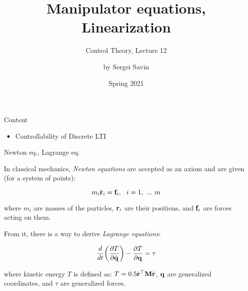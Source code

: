 \documentclass{beamer}
\title{Manipulator equations, Linearization}
\subtitle{Control Theory, Lecture 12}
\author{by Sergei Savin}
\date{Spring 2021}
\begin{document}
\maketitle


\begin{frame}{Content}
\begin{itemize}
\item Controllability of Discrete LTI
\end{itemize}
\end{frame}


\begin{frame}{Newton eq., Lagrange eq.}
\begin{flushleft}

In classical mechanics, \emph{Newton equations} are accepted as an axiom and are given (for a system of points):

\begin{equation}
\label{eq:Newton}
    m_i\ddot{\mathbf{r}}_i = \mathbf{f}_i, \ \ i = 1, \ ... \ m  
\end{equation}

where $m_i$ are masses of the particles, $\mathbf{r}_i$ are their positions, and $\mathbf{f}_i$ are forces acting on them.

\bigskip

From it, there is a way to derive \emph{Lagrange equations}:

\begin{equation}
\label{eq:Lagrange}
    \frac{d}{dt} \bigg( 
    \frac{\partial T }{\partial \dot{\mathbf{q}}}
    \bigg) - 
    \frac{\partial T }{\partial \mathbf{q}} = \tau
\end{equation}

where kinetic energy $T$ is defined as: $T = 0.5 \dot{\mathbf{r}} ^\top \mathbf{M} \dot{\mathbf{r}}$, $\mathbf{q}$ are generalized coordinates, and $\tau$ are generalized forces.

\end{flushleft}
\end{frame}
\end{document}
